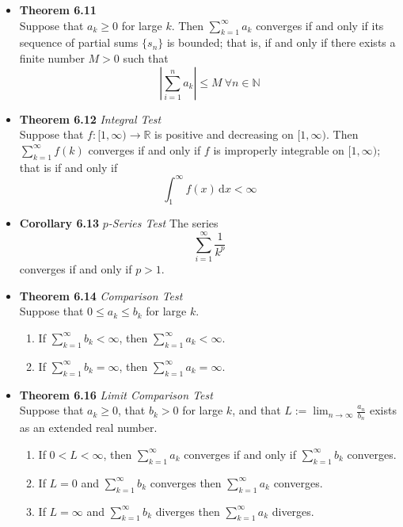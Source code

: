 \documentclass[11pt,a4paper]{article}
\begin{document}
\begin{itemize}
    \item \textbf{Theorem 6.11} \\
        Suppose that $a_k \geq 0$ for large $k$.
        Then $\sum_{k=1}^\infty a_k$ converges if and only if its sequence of partial sums
        $\{s_n\}$ is bounded; that is, if and only if there exists a finite number $M > 0$
        such that
        \[
            \left| \sum_{i=1}^n a_k \right| \leq M \ \forall n \in \mathbb{N}
        \]

    \item \textbf{Theorem 6.12} \emph{Integral Test} \\
        Suppose that $f : [1, \infty) \to \mathbb{R}$ is positive and decreasing on
        $[1, \infty)$.
        Then $\sum_{k=1}^\infty f(k)$ converges if and only if $f$ is improperly integrable
        on $[1, \infty)$; that is if and only if
        \[
            \int_1^\infty f(x)\, \mathrm{d}x < \infty
        \]

    \item \textbf{Corollary 6.13} \emph{$p$-Series Test}
        The series
        \[
            \sum_{i=1}^\infty \frac{1}{k^p}
        \]
        converges if and only if $p > 1$.

    \item \textbf{Theorem 6.14} \emph{Comparison Test} \\
        Suppose that $0 \leq a_k \leq b_k$ for large $k$.
        \begin{enumerate}
            \item If $\sum_{k=1}^\infty b_k < \infty$, then $\sum_{k=1}^\infty a_k < \infty$.
            \item If $\sum_{k=1}^\infty b_k = \infty$, then $\sum_{k=1}^\infty a_k = \infty$.
        \end{enumerate}

    \item \textbf{Theorem 6.16} \emph{Limit Comparison Test} \\
        Suppose that $a_k \geq 0$, that $b_k > 0$ for large $k$, and that
        $L := \lim_{n \to \infty} \frac{a_n}{b_n}$ exists as an extended real number.
        \begin{enumerate}
            \item If $0 < L < \infty$, then $\sum_{k=1}^\infty a_k$ converges if and only if
                $\sum_{k=1}^\infty b_k$ converges.
            \item If $L = 0$ and $\sum_{k=1}^\infty b_k$ converges then
                $\sum_{k=1}^\infty a_k$ converges.
            \item If $L = \infty$ and $\sum_{k=1}^\infty b_k$ diverges then
                $\sum_{k=1}^\infty a_k$ diverges.
        \end{enumerate}

\end{itemize}
\end{document}
